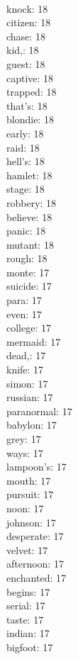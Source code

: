\begin{multicols}{6}
  \\ knock: 18
  \\ citizen: 18
  \\ chase: 18
  \\ kid,: 18
  \\ guest: 18
  \\ captive: 18
  \\ trapped: 18
  \\ that's: 18
  \\ blondie: 18
  \\ early: 18
  \\ raid: 18
  \\ hell's: 18
  \\ hamlet: 18
  \\ stage: 18
  \\ robbery: 18
  \\ believe: 18
  \\ panic: 18
  \\ mutant: 18
  \\ rough: 18
  \\ monte: 17
  \\ suicide: 17
  \\ para: 17
  \\ even: 17
  \\ college: 17
  \\ mermaid: 17
  \\ dead,: 17
  \\ knife: 17
  \\ simon: 17
  \\ russian: 17
  \\ paranormal: 17
  \\ babylon: 17
  \\ grey: 17
  \\ ways: 17
  \\ lampoon's: 17
  \\ mouth: 17
  \\ pursuit: 17
  \\ noon: 17
  \\ johnson: 17
  \\ desperate: 17
  \\ velvet: 17
  \\ afternoon: 17
  \\ enchanted: 17
  \\ begins: 17
  \\ serial: 17
  \\ taste: 17
  \\ indian: 17
  \\ bigfoot: 17

\end{multicols}
